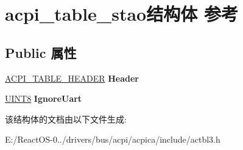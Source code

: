 \hypertarget{structacpi__table__stao}{}\section{acpi\+\_\+table\+\_\+stao结构体 参考}
\label{structacpi__table__stao}
\subsection*{Public 属性}
\begin{DoxyCompactItemize}
\item 
\mbox{\label{structacpi__table__stao_afeca1ea90194519c00ded0f4ca2234af}} 
\hyperlink{structacpi__table__header}{A\+C\+P\+I\+\_\+\+T\+A\+B\+L\+E\+\_\+\+H\+E\+A\+D\+ER} {\bfseries Header}
\item 
\mbox{\label{structacpi__table__stao_a067127af1099696a392c98b083ff7997}} 
\hyperlink{_processor_bind_8h_ab27e9918b538ce9d8ca692479b375b6a}{U\+I\+N\+T8} {\bfseries Ignore\+Uart}
\end{DoxyCompactItemize}


该结构体的文档由以下文件生成\+:\begin{DoxyCompactItemize}
\item 
E\+:/\+React\+O\+S-\/0../drivers/bus/acpi/acpica/include/actbl3.\+h\end{DoxyCompactItemize}
